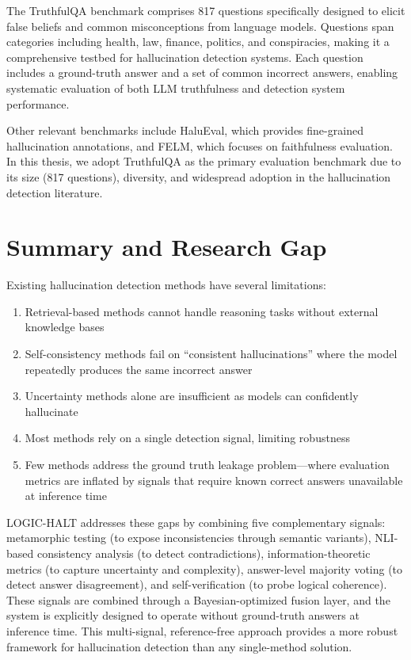 The TruthfulQA benchmark comprises 817 questions specifically designed to elicit false beliefs and common misconceptions from language models. Questions span categories including health, law, finance, politics, and conspiracies, making it a comprehensive testbed for hallucination detection systems. Each question includes a ground-truth answer and a set of common incorrect answers, enabling systematic evaluation of both LLM truthfulness and detection system performance.

Other relevant benchmarks include HaluEval, which provides fine-grained hallucination annotations, and FELM, which focuses on faithfulness evaluation. In this thesis, we adopt TruthfulQA as the primary evaluation benchmark due to its size (817 questions), diversity, and widespread adoption in the hallucination detection literature.

\section{Summary and Research Gap}

Existing hallucination detection methods have several limitations:

\begin{enumerate}
    \item Retrieval-based methods cannot handle reasoning tasks without external knowledge bases
    \item Self-consistency methods fail on ``consistent hallucinations'' where the model repeatedly produces the same incorrect answer
    \item Uncertainty methods alone are insufficient as models can confidently hallucinate
    \item Most methods rely on a single detection signal, limiting robustness
    \item Few methods address the ground truth leakage problem---where evaluation metrics are inflated by signals that require known correct answers unavailable at inference time
\end{enumerate}

LOGIC-HALT addresses these gaps by combining five complementary signals: metamorphic testing (to expose inconsistencies through semantic variants), NLI-based consistency analysis (to detect contradictions), information-theoretic metrics (to capture uncertainty and complexity), answer-level majority voting (to detect answer disagreement), and self-verification (to probe logical coherence). These signals are combined through a Bayesian-optimized fusion layer, and the system is explicitly designed to operate without ground-truth answers at inference time. This multi-signal, reference-free approach provides a more robust framework for hallucination detection than any single-method solution.
